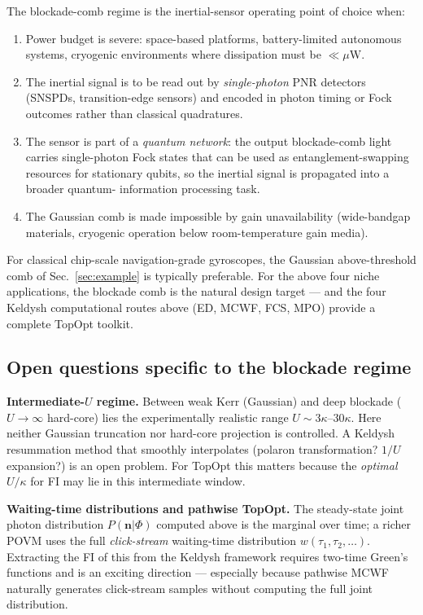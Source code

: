 \documentclass[11pt]{article}
\begin{document}
The blockade-comb regime is the inertial-sensor operating point of
choice when:
\begin{enumerate}\itemsep0em
\item Power budget is severe: space-based platforms, battery-limited
  autonomous systems, cryogenic environments where dissipation must be
  $\ll\mu\mathrm{W}$.
\item The inertial signal is to be read out by \emph{single-photon}
  PNR detectors (SNSPDs, transition-edge sensors) and encoded in
  photon timing or Fock outcomes rather than classical quadratures.
\item The sensor is part of a \emph{quantum network}: the output
  blockade-comb light carries single-photon Fock states that can be
  used as entanglement-swapping resources for stationary qubits,
  so the inertial signal is propagated into a broader quantum-
  information processing task.
\item The Gaussian comb is made impossible by gain unavailability
  (wide-bandgap materials, cryogenic operation below room-temperature
  gain media).
\end{enumerate}

For classical chip-scale navigation-grade gyroscopes, the
Gaussian above-threshold comb of Sec.~\ref{sec:example} is typically
preferable.  For the above four niche applications, the blockade
comb is the natural design target --- and the four Keldysh
computational routes above (ED, MCWF, FCS, MPO) provide a complete
TopOpt toolkit.

\subsection{Open questions specific to the blockade regime}

\begin{open}
\textbf{Intermediate-$U$ regime.}  Between weak Kerr (Gaussian) and
deep blockade ($U\to\infty$ hard-core) lies the experimentally realistic
range $U\sim 3\kappa$--$30\kappa$.  Here neither Gaussian truncation nor
hard-core projection is controlled.  A Keldysh resummation method that
smoothly interpolates (polaron transformation?  $1/U$ expansion?) is an
open problem.  For TopOpt this matters because the \emph{optimal} $U/\kappa$
for FI may lie in this intermediate window.
\end{open}

\begin{open}
\textbf{Waiting-time distributions and pathwise TopOpt.}  The
steady-state joint photon distribution $P(\mathbf{n}|\Phi)$ computed
above is the marginal over time; a richer POVM uses the full
\emph{click-stream} waiting-time distribution
$w(\tau_1, \tau_2, \ldots)$.  Extracting the FI of this from the
Keldysh framework requires two-time Green's functions and is an
exciting direction --- especially because pathwise MCWF
naturally generates click-stream samples without computing the full
joint distribution.
\end{open}
\end{document}
